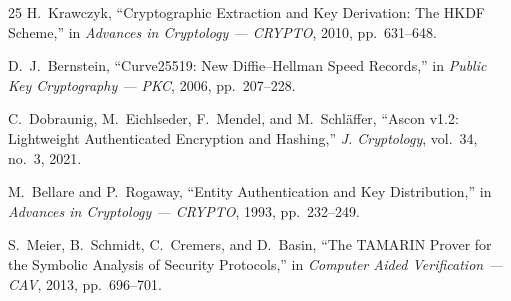 \documentclass[11pt,a4paper]{article}
\begin{document}
\begin{thebibliography}{25}
H.~Krawczyk, ``Cryptographic Extraction and Key Derivation: The HKDF Scheme,'' in \textit{Advances in Cryptology --- CRYPTO}, 2010, pp.~631--648.

D.~J.~Bernstein, ``Curve25519: New Diffie--Hellman Speed Records,'' in \textit{Public Key Cryptography --- PKC}, 2006, pp.~207--228.

C.~Dobraunig, M.~Eichlseder, F.~Mendel, and M.~Schl\"affer, ``Ascon v1.2: Lightweight Authenticated Encryption and Hashing,'' \textit{J. Cryptology}, vol.~34, no.~3, 2021.

M.~Bellare and P.~Rogaway, ``Entity Authentication and Key Distribution,'' in \textit{Advances in Cryptology --- CRYPTO}, 1993, pp.~232--249.

S.~Meier, B.~Schmidt, C.~Cremers, and D.~Basin, ``The TAMARIN Prover for the Symbolic Analysis of Security Protocols,'' in \textit{Computer Aided Verification --- CAV}, 2013, pp.~696--701.

\end{thebibliography}
\end{document}
